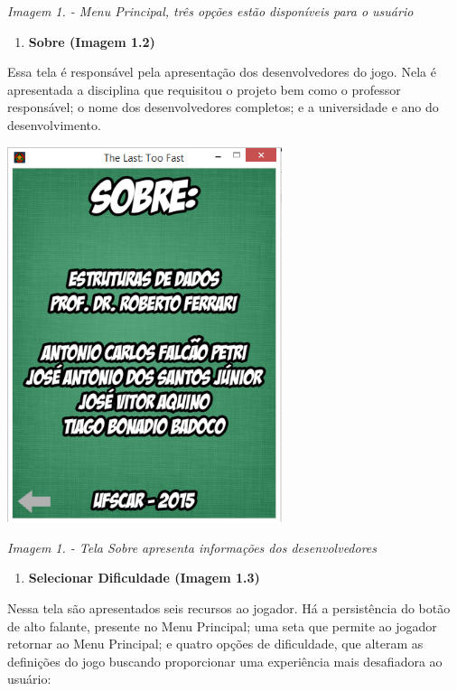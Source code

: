 \documentclass[a4paper]{article}
\newcounter{saveenum}
\newcommand\liststyleWWNumiii{%
\renewcommand\theenumi{\arabic{enumi}}
\renewcommand\theenumii{\alph{enumii}}
\renewcommand\theenumiii{\roman{enumiii}}
\renewcommand\theenumiv{\arabic{enumiv}}
\renewcommand\labelenumi{\theenumi.}
\renewcommand\labelenumii{\theenumii.}
\renewcommand\labelenumiii{\theenumiii.}
\renewcommand\labelenumiv{\theenumiv.}
}
\newcounter{Imagem2}
\renewcommand\theImagem2{\arabic{Imagem2}}
\newcounter{Imagem1}
\renewcommand\theImagem1{\arabic{Imagem1}}
\begin{document}
{\centering\itshape\color[rgb]{0.26666668,0.32941177,0.41568628}
Imagem 1. \stepcounter{Imagem1}{\theImagem1} - Menu Principal, três
opções estão disponíveis para o usuário
\par}


\bigskip

\liststyleWWNumiii
\setcounter{saveenum}{\value{enumi}}
\begin{enumerate}
\setcounter{enumi}{\value{saveenum}}
\item \textbf{Sobre (Imagem 1.2)}
\end{enumerate}
Essa tela é responsável pela apresentação dos desenvolvedores do jogo.
Nela é apresentada a disciplina que requisitou o projeto bem como o
professor responsável; o nome dos desenvolvedores completos; e a
universidade e ano do desenvolvimento.

{\centering 
\includegraphics[width=3.1634in,height=4.3307in]{T1-img3.png} \par}

{\centering\itshape\color[rgb]{0.26666668,0.32941177,0.41568628}
Imagem 1. \stepcounter{Imagem1}{\theImagem1} - Tela
{\textquotedbl}Sobre{\textquotedbl} apresenta informações dos
desenvolvedores
\par}


\bigskip

\liststyleWWNumiii
\setcounter{saveenum}{\value{enumi}}
\begin{enumerate}
\setcounter{enumi}{\value{saveenum}}
\item \textbf{Selecionar Dificuldade (Imagem 1.3)}
\end{enumerate}
Nessa tela são apresentados seis recursos ao jogador. Há a persistência
do botão de alto falante, presente no Menu Principal; uma seta que
permite ao jogador retornar ao Menu Principal; e quatro opções de
dificuldade, que alteram as definições do jogo buscando proporcionar
uma experiência mais desafiadora ao usuário:
\end{document}
